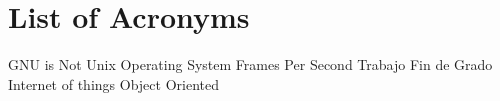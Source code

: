 \chapter{List of Acronyms} %

{\small
\begin{acronym}[XXXXXXXX]
	     	{\acs{GNU} is Not Unix}
			{Operating System}
			{Frames Per Second}
			{Trabajo Fin de Grado}
			{Internet of things}
			{Object Oriented}
\end{acronym}
}




